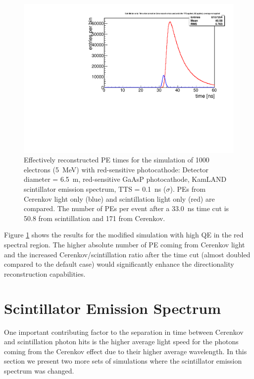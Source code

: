 \documentclass[aps,prc,twocolumn,groupedaddress,showpacs,amsmath,amssymb,floatfix,superscriptaddress]{revtex4}
\begin{document}
\begin{figure}
        \begin{center}
        \includegraphics[scale=0.40]{graphs/6p5Meter_5MeVElectrons_RedSensitiveQE_KamlandScintSpec_TIME.pdf}
        \caption[]{Effectively reconstructed PE times for the simulation of 1000 electrons (5~MeV) with red-sensitive photocathode: Detector diameter = 6.5~m, red-sensitive GaAsP photocathode, KamLAND scintillator emission spectrum, TTS = 0.1~ns ($\sigma$). PEs from Cerenkov light only (blue) and scintillation light only (red) are compared. The number of PEs per event after a 33.0~ns time cut is 50.8 from scintillation and 171 from Cerenkov. \label{6p5Meter_5MeVElectrons_RedSensitiveQE_KamlandScintSpec_TIME}}
        \end{center}
\end{figure}

Figure \ref{6p5Meter_5MeVElectrons_RedSensitiveQE_KamlandScintSpec_TIME} shows the results for the modified simulation with high QE in the red spectral region. The higher absolute number of PE coming from Cerenkov light and the increased Cerenkov/scintillation ratio after the time cut (almost doubled compared to the default case) would significantly enhance the directionality reconstruction capabilities.  

\section{Scintillator Emission Spectrum}
\label{scintillator_emission_sec}
One important contributing factor to the separation in time between Cerenkov and scintillation photon hits is the higher average light speed for the photons coming from the Cerenkov effect due to their higher average wavelength. In this section we present two more sets of simulations where the scintillator emission spectrum was changed. 
\end{document}
